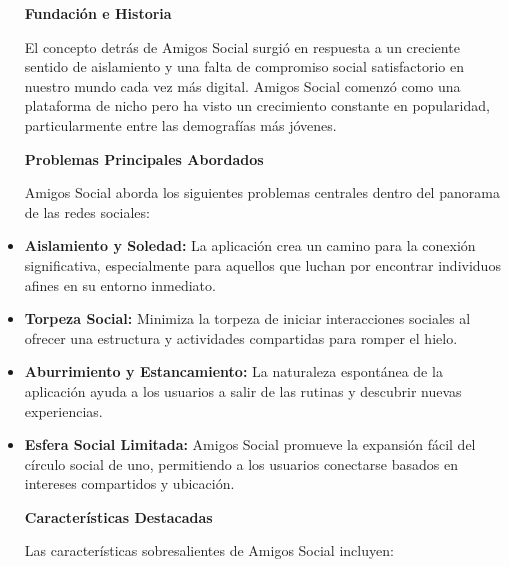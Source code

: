 \begin{itemize}
\textbf{Fundación e Historia}

El concepto detrás de Amigos Social surgió en respuesta a un creciente sentido de aislamiento y una falta de compromiso social 
satisfactorio en nuestro mundo cada vez más digital. Amigos Social comenzó como una plataforma de nicho pero ha visto un crecimiento constante en popularidad, particularmente entre las demografías más jóvenes.


\textbf{Problemas Principales Abordados}

Amigos Social aborda los siguientes problemas centrales dentro del panorama de las redes sociales:

\item \textbf{Aislamiento y Soledad:} La aplicación crea un camino para la conexión significativa, especialmente para aquellos que luchan por encontrar individuos afines en su entorno inmediato.
\item \textbf{Torpeza Social:} Minimiza la torpeza de iniciar interacciones sociales al ofrecer una estructura y actividades compartidas para romper el hielo.
\item \textbf{Aburrimiento y Estancamiento:} La naturaleza espontánea de la aplicación ayuda a los usuarios a salir de las rutinas y descubrir nuevas experiencias.
\item \textbf{Esfera Social Limitada:} Amigos Social promueve la expansión fácil del círculo social de uno, permitiendo a los usuarios conectarse basados en intereses compartidos y ubicación.

\textbf{Características Destacadas}

Las características sobresalientes de Amigos Social incluyen:


\end{itemize}
